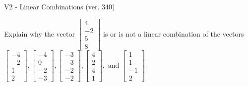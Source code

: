 \begin{exercise}
  \begin{exerciseTitle}V2 - Linear Combinations (ver. 340)\end{exerciseTitle}
  \begin{exerciseStatement}
    Explain why the vector \(\left[\begin{array}{c}
4 \\
-2 \\
5 \\
8
\end{array}\right]\)  is or is not a linear 
	combination of the vectors \(\left[\begin{array}{c}
-4 \\
-2 \\
1 \\
2
\end{array}\right] , \left[\begin{array}{c}
-4 \\
0 \\
-2 \\
-3
\end{array}\right] , \left[\begin{array}{c}
-3 \\
-3 \\
-2 \\
-2
\end{array}\right] , \left[\begin{array}{c}
4 \\
2 \\
4 \\
1
\end{array}\right] , \text{ and } \left[\begin{array}{c}
1 \\
1 \\
-1 \\
2
\end{array}\right]\).
	



\end{exerciseStatement}
\end{exercise}
